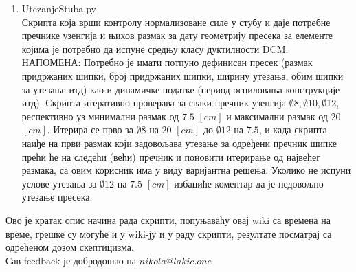 \documentclass[11pt, a4paper]{article}
\begin{document}
\begin{enumerate}
\item {\Large{UtezanjeStuba.py}}\\[5mm]
Скрипта која врши контролу нормализоване силе у стубу и даје потребне пречнике узенгија и њихов размак за дату геометрију пресека за елементе којима је потребно да испуне средњу класу дуктилности DCM.\\
НАПОМЕНА: Потребно је имати потпуно дефинисан пресек (размак придржаних шипки, број придржаних шипки, ширину утезања, обим шипки за утезање итд) као и динамичке податке (период осциловања конструкције итд). Скрипта итеративно проверава за сваки пречник узенгија  $\emptyset8, \emptyset10, \emptyset12$, респективно уз минимални размак од $7.5$ $[cm]$ и максимални размак од $20$ $[cm]$. Итерира се прво за $\emptyset8$ на $20$ $[cm]$ до $\emptyset12$ на $7.5$, и када скрипта наиђе на први размак који задовољава утезање за одређени пречник шипке прећи ће на следећи (већи) пречник и поновити итерирање од највећег размака, са овим корисник има у виду варијантна решења. Уколико не испуни услове утезања за $\emptyset12$ на $7.5$ $[cm]$ избациће коментар да је недовољно утезање пресека.
\end{enumerate}

\LARGE{Ово је кратак опис начина рада скрипти, попуњаваћу овај wiki са времена на време, грешке су могуће и у wiki-ју и у раду скрипти, резултате посматрај са одрећеном дозом скептицизма.}\\

\Large{Сав feedback је добродошао на $nikola@lakic.one$}
\end{document}
